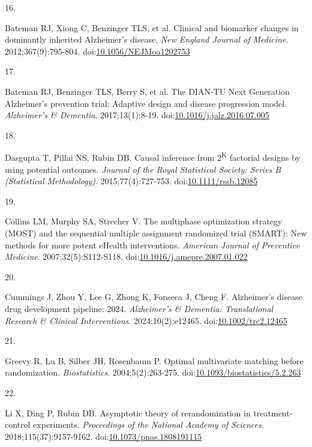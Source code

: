 \documentclass[
  11pt,
]{article}
\newlength{\cslhangindent}
\newlength{\csllabelwidth}
\newenvironment{CSLReferences}[2] %
 {\begin{list}{}{%
  \setlength{\itemindent}{0pt}
  \setlength{\leftmargin}{0pt}
  \setlength{\parsep}{0pt}
  \ifodd #1
   \setlength{\leftmargin}{\cslhangindent}
   \setlength{\itemindent}{-1\cslhangindent}
  \fi
  \setlength{\itemsep}{#2\baselineskip}}}
 {\end{list}}
\newcommand{\CSLLeftMargin}[1]{\parbox[t]{\csllabelwidth}{\strut#1\strut}}
\newcommand{\CSLRightInline}[1]{\parbox[t]{\linewidth - \csllabelwidth}{\strut#1\strut}}
\begin{document}
\begin{CSLReferences}{0}{1}
\CSLLeftMargin{16. }%
\CSLRightInline{Bateman RJ, Xiong C, Benzinger TLS, et al. Clinical and biomarker changes in dominantly inherited {Alzheimer}'s disease. \emph{New England Journal of Medicine}. 2012;367(9):795-804. doi:\href{https://doi.org/10.1056/NEJMoa1202753}{10.1056/NEJMoa1202753}}

\CSLLeftMargin{17. }%
\CSLRightInline{Bateman RJ, Benzinger TLS, Berry S, et al. The {DIAN-TU Next Generation Alzheimer}'s prevention trial: Adaptive design and disease progression model. \emph{Alzheimer's \& Dementia}. 2017;13(1):8-19. doi:\href{https://doi.org/10.1016/j.jalz.2016.07.005}{10.1016/j.jalz.2016.07.005}}

\CSLLeftMargin{18. }%
\CSLRightInline{Dasgupta T, Pillai NS, Rubin DB. Causal inference from 2\textsuperscript{K} factorial designs by using potential outcomes. \emph{Journal of the Royal Statistical Society: Series B (Statistical Methodology)}. 2015;77(4):727-753. doi:\href{https://doi.org/10.1111/rssb.12085}{10.1111/rssb.12085}}

\CSLLeftMargin{19. }%
\CSLRightInline{Collins LM, Murphy SA, Strecher V. The multiphase optimization strategy ({MOST}) and the sequential multiple assignment randomized trial ({SMART}): New methods for more potent {eHealth} interventions. \emph{American Journal of Preventive Medicine}. 2007;32(5):S112-S118. doi:\href{https://doi.org/10.1016/j.amepre.2007.01.022}{10.1016/j.amepre.2007.01.022}}

\CSLLeftMargin{20. }%
\CSLRightInline{Cummings J, Zhou Y, Lee G, Zhong K, Fonseca J, Cheng F. Alzheimer's disease drug development pipeline: 2024. \emph{Alzheimer's \& Dementia: Translational Research \& Clinical Interventions}. 2024;10(2):e12465. doi:\href{https://doi.org/10.1002/trc2.12465}{10.1002/trc2.12465}}

\CSLLeftMargin{21. }%
\CSLRightInline{Greevy R, Lu B, Silber JH, Rosenbaum P. Optimal multivariate matching before randomization. \emph{Biostatistics}. 2004;5(2):263-275. doi:\href{https://doi.org/10.1093/biostatistics/5.2.263}{10.1093/biostatistics/5.2.263}}

\CSLLeftMargin{22. }%
\CSLRightInline{Li X, Ding P, Rubin DB. Asymptotic theory of rerandomization in treatment-control experiments. \emph{Proceedings of the National Academy of Sciences}. 2018;115(37):9157-9162. doi:\href{https://doi.org/10.1073/pnas.1808191115}{10.1073/pnas.1808191115}}


\end{CSLReferences}
\end{document}
